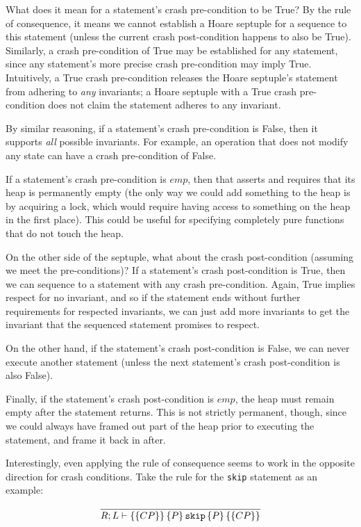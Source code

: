 What does it mean for a statement's crash pre-condition to be True? By the rule
of consequence, it means we cannot establish a Hoare septuple for a sequence
to this statement (unless the current crash post-condition happens to also be
True). Similarly, a crash pre-condition of True may be established for any
statement, since any statement's more precise crash pre-condition may imply
True. Intuitively, a True crash pre-condition releases the Hoare septuple's
statement from adhering to \textit{any} invariants; a Hoare septuple with a
True crash pre-condition does not claim the statement adheres to any invariant.

By similar reasoning, if a statement's crash pre-condition is False, then it
supports \textit{all} possible invariants. For example, an operation that does
not modify any state can have a crash pre-condition of False.

If a statement's crash pre-condition is $emp$, then that asserts and requires
that its heap is permanently empty (the only way we could add something to the
heap is by acquiring a lock, which would require having access to something on
the heap in the first place). This could be useful for specifying completely
pure functions that do not touch the heap.

On the other side of the septuple, what about the crash post-condition
(assuming we meet the pre-conditions)? If a statement's crash post-condition
is True, then we can sequence to a statement with any crash pre-condition.
Again, True implies respect for no invariant, and so if the statement ends
without further requirements for respected invariants, we can just add more
invariants to get the invariant that the sequenced statement promises to
respect.

On the other hand, if the statement's crash post-condition is False, we can
never execute another statement (unless the next statement's crash
post-condition is also False).

Finally, if the statement's crash post-condition is $emp$, the heap must remain
empty after the statement returns. This is not strictly permanent, though,
since we could always have framed out part of the heap prior to executing the
statement, and frame it back in after.

Interestingly, even applying the rule of consequence seems to work in the
opposite direction for crash conditions. Take the rule for the \texttt{skip}
statement as an example:

\begin{gather*}
    \infer{\hoarestmt{R}{L}{CP}{P}{\texttt{skip}}{P}{CP}}{}
\end{gather*}

